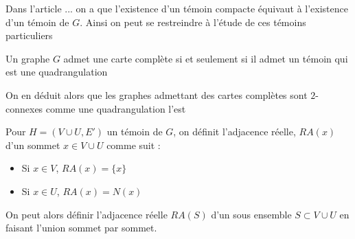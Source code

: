 \documentclass{scrartcl}
\begin{document}
\begin{flushleft}
Dans l'article ... on a que l'existence d'un témoin compacte équivaut à l'existence d'un témoin de $G$. Ainsi on peut se restreindre
à l'étude de ces témoins particuliers

\begin{theorem}\label{complQuadr}
    Un graphe $G$ admet une carte complète si et seulement si il admet un témoin qui est une quadrangulation
\end{theorem}

On en déduit alors que les graphes admettant des cartes complètes sont $2$-connexes comme une quadrangulation l'est

\begin{def*}
    Pour $H = (V \cup U, E')$ un témoin de $G$, on définit l'adjacence réelle, $RA(x)$ d'un sommet $x \in V \cup U$ comme suit :
    \begin{itemize}
        \item Si $x \in V$, $RA(x) = \{x\}$
        \item Si $x \in U$, $RA(x) = N(x)$
    \end{itemize}
    On peut alors définir l'adjacence réelle $RA(S)$ d'un sous ensemble $S \subset V \cup U$ en faisant l'union sommet par sommet.
\end{def*}

\begin{comment}

\subsection{Contractibilité des arrêtes}

On aimerait donner une condition nécessaire et suffisante permettant de contracter les arrêtes d'un graphe de carte.
Certaines arrêtes sont clairement contractibles, comme celles représentées par $2$ régions partageant une courbe, d'autres ne le sont
pas, comme l'arrête $xy$ du graphe $G_{pch}$ \ref{Gpch}, qui est un graphe de carte.
On dénotera par $\mathcal{G}_{pch}$ l'ensemble des graphes obtenu depuis $G_{pch}$,
en ajoutant des arrêtes entre les sommets distincts de $a, b, c$

\begin{figure}[h]
    \caption{Le graphe $G_{pch}$}\label{Gpch}
    \begin{center}
        \begin{tikzpicture}[auto]
            \begin{scope}[every node/.style={circle, draw}]
                \node (a) {$a$};
                \node (b) [right = 20mm of a] {$b$};
                \node (c) [right = of b] {$c$};
                \node (x) [below left = 12mm and 5mm of a] {$x$};
                \node (y) [below right = 12mm and 5mm of a] {$y$};
                \node (u) [below = of b] {$u$};
                \node (v) [below = of c] {$v$};


\end{comment}
\end{flushleft}
\end{document}
